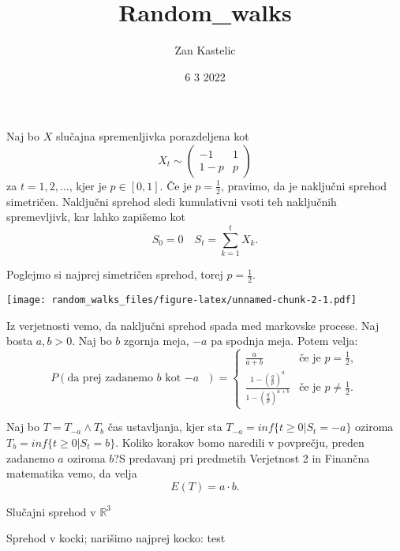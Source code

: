 \documentclass[
]{article}
\title{Random\_walks}
\author{Zan Kastelic}
\date{6 3 2022}
\begin{document}
\maketitle

Naj bo \(X\) slučajna spremenljivka porazdeljena kot \[
X_t \sim \begin{pmatrix}
-1 & 1 \\
1-p & p
\end{pmatrix} 
\] za \(t=1,2, \ldots\), kjer je \(p \in [0,1]\). Če je
\(p=\frac{1}{2}\), pravimo, da je naključni sprehod simetričen.
Naključni sprehod sledi kumulativni vsoti teh naključnih spremevljivk,
kar lahko zapišemo kot \[
S_0=0 \quad S_t=\sum_{k=1}^tX_k.
\]

Poglejmo si najprej simetričen sprehod, torej \(p=\frac{1}{2}\).

\texttt{[image: random\_walks\_files/figure-latex/unnamed-chunk-2-1.pdf]}

Iz verjetnosti vemo, da naključni sprehod spada med markovske procese.
Naj bosta \(a,b > 0\). Naj bo \(b\) zgornja meja, \(-a\) pa spodnja
meja. Potem velja: \[
P(\text{da prej zadanemo $b$ kot $-a$ })=\begin{cases}
      \frac{a}{a+b} & \text{če je } p=\frac{1}{2}, \\
      \frac{1-(\frac{q}{p})^a}{1-(\frac{q}{p})^{a+b}} & \text{če je } p \neq \frac{1}{2}.
    \end{cases}       
\]

Naj bo \(T = T_{-a} \wedge T_b\) čas ustavljanja, kjer sta
\(T_{-a}=inf\{t \geq 0 | S_t = -a \}\) oziroma
\(T_b=inf\{t \geq 0 | S_t = b \}\). Koliko korakov bomo naredili v
povprečju, preden zadanemo \(a\) oziroma \(b\)?S predavanj pri predmetih
Verjetnost 2 in Finančna matematika vemo, da velja \[
E(T)=a\cdot b.
\]

Slučajni sprehod v \(\mathbb{R}^3\)

Sprehod v kocki; narišimo najprej kocko: test
\end{document}
